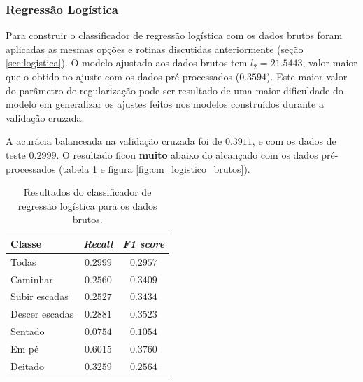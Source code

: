 \documentclass[final,5p]{elsarticle}
\numberwithin{equation}{section}
\begin{document}
    \subsubsection{Regressão Logística}

        Para construir o classificador de regressão logística com os dados brutos foram aplicadas as mesmas opções e rotinas discutidas anteriormente (seção \ref{sec:logistica}). O modelo ajustado aos dados brutos tem $l_2 = 21.5443$, valor maior que o obtido no ajuste com os dados pré-processados ($0.3594$). Este maior valor do parâmetro de regularização pode ser resultado de uma maior dificuldade do modelo em generalizar os ajustes feitos nos modelos construídos durante a validação cruzada.

        A acurácia balanceada na validação cruzada foi de $0.3911$, e com os dados de teste $0.2999$. O resultado ficou \textbf{muito} abaixo do alcançado com os dados pré-processados (tabela \ref{tab:resultados_logistico_brutos} e figura \ref{fig:cm_logistico_brutos}).

        \begin{table}[h]
            \centering
            \begin{tabular}{l c c}
                \toprule
                \textbf{Classe} & \textbf{\emph{Recall}}  & \textbf{\emph{F1 score}} \\
                \midrule
                Todas & $0.2999$ & $0.2957$ \\
                \addlinespace
                Caminhar   & $0.2560$ & $0.3409$ \\
                Subir escadas   & $0.2527$ & $0.3434$ \\
                Descer escadas & $0.2881$ & $0.3523$ \\
                Sentado   & $0.0754$ & $0.1054$ \\
                Em pé  & $0.6015$ & $0.3760$ \\
                Deitado    & $0.3259$ & $0.2564$ \\
                \bottomrule
            \end{tabular}
            \caption{Resultados do classificador de regressão logística para os dados brutos.}
            \label{tab:resultados_logistico_brutos}
        \end{table}
\end{document}
